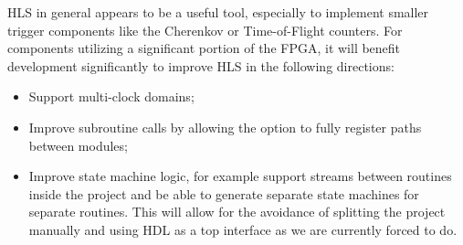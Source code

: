 HLS in general appears to be a useful tool, especially to implement smaller trigger components like the Cherenkov or Time-of-Flight counters. For components utilizing a significant portion of the FPGA, it will benefit development significantly to improve HLS in the following directions:

\begin{itemize}
	\item Support multi-clock domains;
	\item Improve subroutine calls by allowing the option to fully register paths between modules; 
	\item Improve state machine logic, for example support streams between routines inside the project and be able to generate separate state machines for separate routines. This will allow for the avoidance of splitting the project manually and using HDL as a top interface as we are currently forced to do.
\end{itemize}
